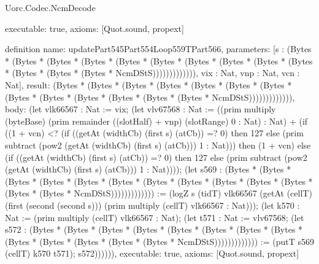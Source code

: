 \begin{lexlean}{Uorc.Codec.NcmDecode}
\begin{semanticmodule}
{  executable: true,
  axioms: [Quot.sound, propext]
}

definition{
  name: updatePart545Part554Loop559TPart566,
  parameters: [s : (Bytes * (Bytes * (Bytes * (Bytes * (Bytes * (Bytes * (Bytes * (Bytes * (Bytes * (Bytes * (Bytes * (Bytes * (Bytes * NcmDStS))))))))))))), vix : Nat, vnp : Nat, vcn : Nat],
  result: (Bytes * (Bytes * (Bytes * (Bytes * (Bytes * (Bytes * (Bytes * (Bytes * (Bytes * (Bytes * (Bytes * (Bytes * (Bytes * NcmDStS))))))))))))),
  body: (let vlk66567 : Nat := vix; (let vlv67568 : Nat := ((prim multiply (byteBase) (prim remainder ((slotHalf) + vnp) (slotRange) 0 : Nat) : Nat) + (if ((1 + vcn) <? (if ((getAt (widthCb) (first s) (atCb)) =? 0) then 127 else (prim subtract (pow2 (getAt (widthCb) (first s) (atCb))) 1 : Nat))) then (1 + vcn) else (if ((getAt (widthCb) (first s) (atCb)) =? 0) then 127 else (prim subtract (pow2 (getAt (widthCb) (first s) (atCb))) 1 : Nat)))); (let s569 : (Bytes * (Bytes * (Bytes * (Bytes * (Bytes * (Bytes * (Bytes * (Bytes * (Bytes * (Bytes * (Bytes * (Bytes * (Bytes * NcmDStS))))))))))))) := (logZ s (tidT) vlk66567 (getAt (cellT) (first (second (second s))) (prim multiply (cellT) vlk66567 : Nat))); (let k570 : Nat := (prim multiply (cellT) vlk66567 : Nat); (let t571 : Nat := vlv67568; (let s572 : (Bytes * (Bytes * (Bytes * (Bytes * (Bytes * (Bytes * (Bytes * (Bytes * (Bytes * (Bytes * (Bytes * (Bytes * (Bytes * NcmDStS))))))))))))) := (putT s569 (cellT) k570 t571); s572)))))),
  executable: true,
  axioms: [Quot.sound, propext]
}


\end{semanticmodule}
\end{lexlean}
